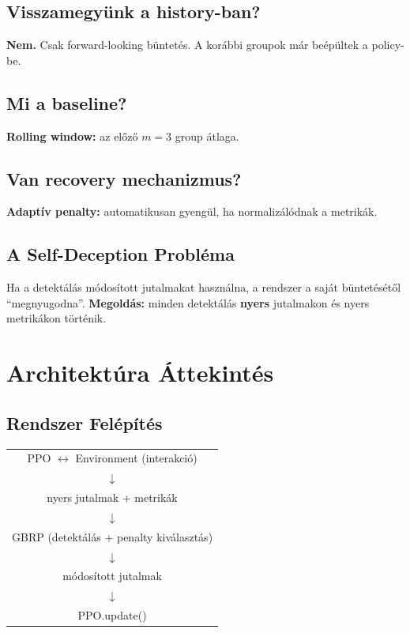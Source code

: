 \documentclass{article}
\begin{document}
\subsection{Visszamegyünk a history-ban?}
\textbf{Nem.} Csak forward-looking büntetés. A korábbi groupok már beépültek a policy-be.

\subsection{Mi a baseline?}
\textbf{Rolling window:} az előző $m=3$ group átlaga.

\subsection{Van recovery mechanizmus?}
\textbf{Adaptív penalty:} automatikusan gyengül, ha normalizálódnak a metrikák.

\subsection{A Self-Deception Probléma}
Ha a detektálás módosított jutalmakat használna, a rendszer a saját büntetésétől ``megnyugodna''. \textbf{Megoldás:} minden detektálás \textbf{nyers} jutalmakon és nyers metrikákon történik.

\section{Architektúra Áttekintés}

\subsection{Rendszer Felépítés}
\begin{center}
\begin{tabular}{c}
PPO $\leftrightarrow$ Environment (interakció) \\
$\downarrow$ \\
nyers jutalmak + metrikák \\
$\downarrow$ \\
GBRP (detektálás + penalty kiválasztás) \\
$\downarrow$ \\
módosított jutalmak \\
$\downarrow$ \\
PPO.update() \\
\end{tabular}
\end{center}
\end{document}
